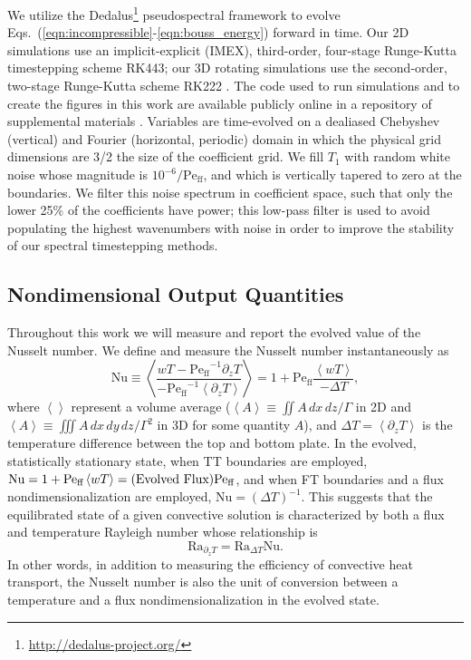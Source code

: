 \documentclass[aps, pre, onecolumn, nofootinbib, notitlepage, groupedaddress, amsfonts, amssymb, amsmath, longbibliography, superscriptaddress]{revtex4-1}
\newcommand{\angles}[1]{\ensuremath{\left\langle #1 \right\rangle}}
\newcommand{\Peff}{\ensuremath{\text{Pe}_{\text{ff}}}}
\begin{document}
We utilize the Dedalus\footnote{\url{http://dedalus-project.org/}} pseudospectral framework \cite{burns&all2016, burns&all2019} to evolve Eqs.~(\ref{eqn:incompressible}-\ref{eqn:bouss_energy}) forward in time.
Our 2D simulations use an implicit-explicit (IMEX), third-order, four-stage Runge-Kutta timestepping scheme RK443; our 3D rotating simulations use the second-order, two-stage Runge-Kutta scheme RK222 \cite{ascher&all1997}. 
The code used to run simulations and to create the figures in this work are available publicly online in a repository of supplemental materials \cite{anders&all2020a_supp}.
Variables are time-evolved on a dealiased Chebyshev (vertical) and Fourier (horizontal, periodic) domain in which the physical grid dimensions are 3/2 the size of the coefficient grid.  
We fill $T_1$ with random white noise whose magnitude is $10^{-6}/\Peff$, and which is vertically tapered to zero at the boundaries.
We filter this noise spectrum in coefficient space, such that only the lower 25\% of the coefficients have power; this low-pass filter is used to avoid populating the highest wavenumbers with noise in order to improve the stability of our spectral timestepping methods.


\subsection{Nondimensional Output Quantities}
\label{sec:ra_nu_relations}
Throughout this work we will measure and report the evolved value of the Nusselt number.
We define and measure the Nusselt number instantaneously as
\begin{equation}
\text{Nu} \equiv \angles{\frac{w T - \Peff^{-1} \partial_z T}{-\Peff^{-1} \angles{\partial_z T}}}
= 1 + \Peff\frac{\angles{w T}}{-\Delta T},
\end{equation}
where $\angles{}$ represent a volume average ($\angles{A} \equiv \iint A\,dx\,dz / \Gamma$ in 2D and $\angles{A} \equiv \iiint A\,dx\,dy\,dz / \Gamma^2$ in 3D for some quantity $A$), and $\Delta T = \angles{\partial_z T}$ is the temperature difference between the top and bottom plate.
In the evolved, statistically stationary state, when TT boundaries are employed, $\text{Nu} = 1 + \Peff\angles{wT} = \text{(Evolved Flux)\Peff}$, and when FT boundaries and a flux nondimensionalization are employed, $\text{Nu} = (\Delta T)^{-1}$.
This suggests that the equilibrated state of a given convective solution is characterized by both a flux and temperature Rayleigh number whose relationship is
\begin{equation}
\text{Ra}_{\partial_z T} = \text{Ra}_{\Delta T} \text{Nu}.
\label{eqn:ra_relation}
\end{equation}
In other words, in addition to measuring the efficiency of convective heat transport, the Nusselt number is also the unit of conversion between a temperature and a flux nondimensionalization in the evolved state.
\end{document}
